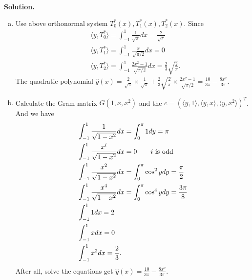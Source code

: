\documentclass[a4paper]{book}
\newenvironment{solution}%
{\noindent\textbf{Solution.}}%
{\qedhere}
\numberwithin{equation}{chapter}
\theoremstyle{definition}
\begin{document}
\begin{solution}
  \begin{enumerate}[(a)]
  \item Use above orthonormal system $T_0^*(x),T_1^*(x), T_2^*(x)$.
    Since
    \begin{align*}
      &\langle y, T_0^* \rangle = \int_{-1}^1  \frac{1}{\sqrt{\pi}} dx =  \frac{2}{\sqrt{\pi}}\\
      &\langle y, T_1^* \rangle = \int_{-1}^1 \frac{x}{\sqrt{\pi/2}}dx = 0 \\
      &\langle y, T_2^* \rangle = \int_{-1}^1 \frac{2x^2 - 1}{\sqrt{\pi/2}} dx = \frac{2}{3} \sqrt{\frac{2}{\pi}}.
    \end{align*}
    The quadratic polynomial $\hat{y}(x) = \frac{2}{\sqrt{\pi}} \times \frac{1}{\sqrt{\pi}}  +  \frac{2}{3} \sqrt{\frac{2}{\pi}} \times  \frac{2x^2 - 1}{\sqrt{\pi/2}} = \frac{10}{3\pi} - \frac{8x^2}{3\pi}$.

  \item Calculate the Gram matrix $G(1, x, x^2)$ and the $c = (\langle y,1 \rangle, \langle y,x \rangle, \langle y,x^2 \rangle)^T$. And we have
    \begin{align*}
      &\int_{-1}^1 \frac{1}{\sqrt{1 -x ^2}} dx = \int_0^\pi 1 dy = \pi \\
      &\int_{-1}^1 \frac{x^i}{\sqrt{1 -x ^2}} dx = 0 \qquad i \textmd{ is odd} \\
      &\int_{-1}^1 \frac{x^2}{\sqrt{1 -x ^2}} dx = \int_0^\pi \cos^2 y dy = \frac{\pi}{2} \\
      &\int_{-1}^1 \frac{x^4}{\sqrt{1 -x ^2}} dx = \int_0^\pi \cos^4 y dy = \frac{3\pi}{8} \\
      &\int_{-1}^1 1 dx = 2 \\
      &\int_{-1}^1 x dx  = 0 \\
      &\int_{-1}^1 x^2 dx  = \frac{2}{3}.
    \end{align*}
    After all, solve the equations get $\hat{y}(x) = \frac{10}{3\pi} - \frac{8x^2}{3\pi} $.
  \end{enumerate}
\end{solution}
\end{document}
